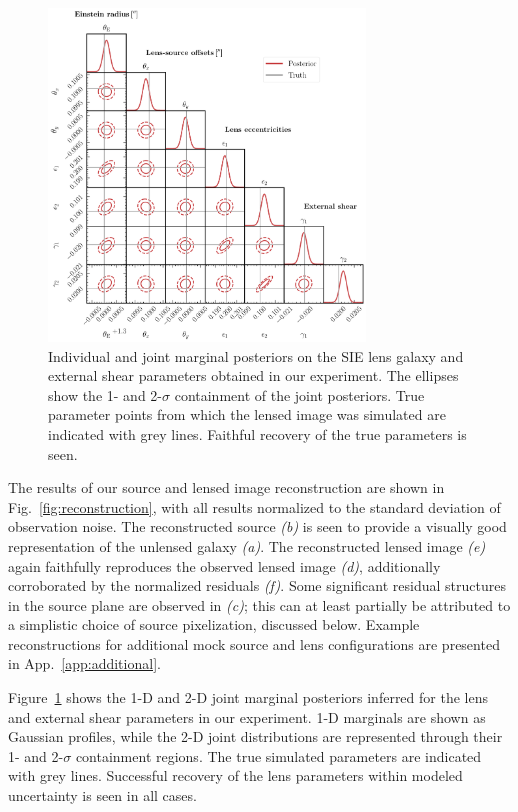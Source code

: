 \documentclass[nohyperref]{article}
\theoremstyle{plain}
\theoremstyle{definition}
\theoremstyle{remark}
\begin{document}
\begin{figure}[!ht]
\centering
\includegraphics[width=0.75\textwidth]{figures/joint_lens.pdf}
\vspace{-1em}
\caption{Individual and joint marginal posteriors on the SIE lens galaxy and external shear parameters obtained in our experiment. The ellipses show the 1- and 2-$\sigma$ containment of the joint posteriors. True parameter points from which the lensed image was simulated are indicated with grey lines. Faithful recovery of the true parameters is seen.}\label{fig:joint_lens}
\vspace{-0.5em}
\end{figure}
The results of our source and lensed image reconstruction are shown in Fig.~\ref{fig:reconstruction}, with all results normalized to the standard deviation of observation noise. The reconstructed source \emph{(b)} is seen to provide a visually good representation of the unlensed galaxy \emph{(a)}. The reconstructed lensed image \emph{(e)} again faithfully reproduces the observed lensed image \emph{(d)}, additionally corroborated by the normalized residuals \emph{(f)}. Some significant residual structures in the source plane are observed in \emph{(c)}; this can at least partially be attributed to a simplistic choice of source pixelization, discussed below. Example reconstructions for additional mock source and lens configurations are presented in App.~\ref{app:additional}.

Figure~\ref{fig:joint_lens} shows the 1-D and 2-D joint marginal posteriors inferred for the lens and external shear parameters in our experiment. 1-D marginals are shown as Gaussian profiles, while the 2-D joint distributions are represented through their 1- and 2-$\sigma$ containment regions. The true simulated parameters are indicated with grey lines. Successful recovery of the lens parameters within modeled uncertainty is seen in all cases.
\end{document}
